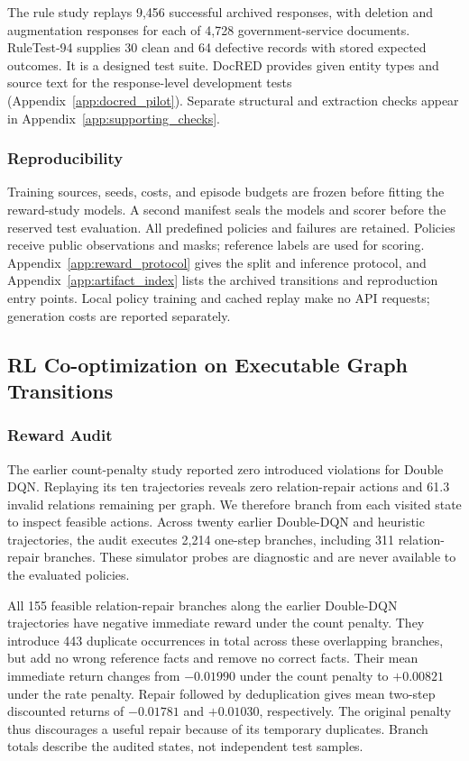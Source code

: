 The rule study replays 9,456 successful archived responses, with deletion and augmentation responses for each of 4,728 government-service documents. RuleTest-94 supplies 30 clean and 64 defective records with stored expected outcomes. It is a designed test suite. DocRED provides given entity types and source text for the response-level development tests (Appendix~\ref{app:docred_pilot}). Separate structural and extraction checks appear in Appendix~\ref{app:supporting_checks}.

\subsubsection{Reproducibility}
\label{subsubsec:runtime_reproducibility}
Training sources, seeds, costs, and episode budgets are frozen before fitting the reward-study models. A second manifest seals the models and scorer before the reserved test evaluation. All predefined policies and failures are retained. Policies receive public observations and masks; reference labels are used for scoring. Appendix~\ref{app:reward_protocol} gives the split and inference protocol, and Appendix~\ref{app:artifact_index} lists the archived transitions and reproduction entry points. Local policy training and cached replay make no API requests; generation costs are reported separately.

\subsection{RL Co-optimization on Executable Graph Transitions}
\label{subsec:rl_results}
\subsubsection{Reward Audit}
The earlier count-penalty study reported zero introduced violations for Double DQN. Replaying its ten trajectories reveals zero relation-repair actions and 61.3 invalid relations remaining per graph. We therefore branch from each visited state to inspect feasible actions. Across twenty earlier Double-DQN and heuristic trajectories, the audit executes 2,214 one-step branches, including 311 relation-repair branches. These simulator probes are diagnostic and are never available to the evaluated policies.

All 155 feasible relation-repair branches along the earlier Double-DQN trajectories have negative immediate reward under the count penalty. They introduce 443 duplicate occurrences in total across these overlapping branches, but add no wrong reference facts and remove no correct facts. Their mean immediate return changes from $-0.01990$ under the count penalty to $+0.00821$ under the rate penalty. Repair followed by deduplication gives mean two-step discounted returns of $-0.01781$ and $+0.01030$, respectively. The original penalty thus discourages a useful repair because of its temporary duplicates. Branch totals describe the audited states, not independent test samples.

